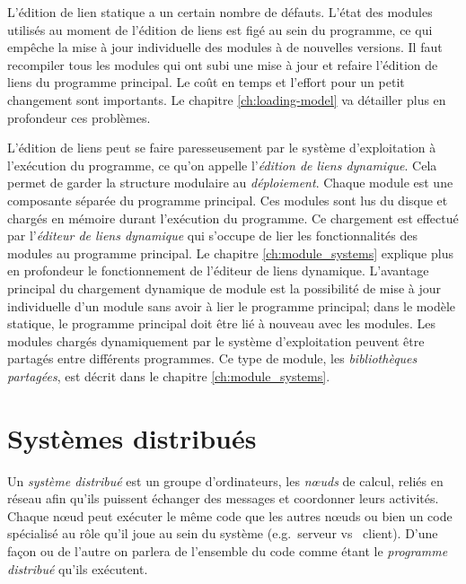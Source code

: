 L'édition de lien statique a un certain nombre de défauts. L'état des
modules utilisés au moment de l'édition de liens est figé au sein du
programme, ce qui empêche la mise à jour individuelle des modules à de nouvelles versions. Il faut
recompiler tous les modules qui ont subi une mise à jour et refaire l'édition de liens du
programme principal. Le coût en temps et l'effort pour un petit changement
sont importants.  Le chapitre \ref{ch:loading-model} va détailler plus en profondeur
ces problèmes.

L'édition de liens peut se faire paresseusement par le système d'exploitation à
l'exécution du programme, ce qu'on appelle l'\textit{édition de liens dynamique}.  Cela
permet de garder la structure modulaire au \textit{déploiement}.
Chaque module est une composante séparée du programme principal.  Ces modules
sont lus du disque et chargés en mémoire durant l'exécution du programme.  Ce
chargement est effectué par l'\textit{éditeur de liens dynamique} qui s'occupe de
lier les fonctionnalités des modules au programme principal. Le chapitre %
\ref{ch:module_systems} explique plus en profondeur le fonctionnement de l'éditeur de liens
dynamique. L'avantage principal du chargement dynamique de module est la possibilité de mise à jour
individuelle d'un module sans avoir à lier le programme principal; dans le
modèle statique, le programme principal doit être lié à nouveau avec les modules.
Les modules chargés dynamiquement par le système d'exploitation peuvent être partagés entre différents
programmes. Ce type de module, les \textit{bibliothèques partagées}, est décrit dans
le chapitre \ref{ch:module_systems}.

\section{Systèmes distribués}


Un \textit{système distribué} est un groupe d'ordinateurs, les
\textit{nœuds} de calcul, reliés en réseau afin qu'ils puissent
échanger des messages et coordonner leurs activités.  Chaque nœud peut
exécuter le même code que les autres nœuds ou bien un code spécialisé
au rôle qu'il joue au sein du système (e.g.~serveur vs ~client).
D'une façon ou de l'autre on parlera de l'ensemble du code comme étant
le \textit{programme distribué} qu'ils exécutent.

